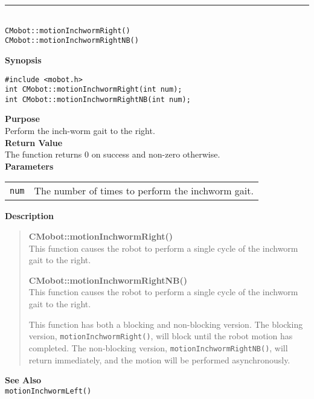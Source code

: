 \noindent
\vspace{5pt}
\rule{4.5in}{0.015in}\\
\noindent
{\LARGE \texttt{CMobot::motionInchwormRight()}}\\
{\LARGE \texttt{CMobot::motionInchwormRightNB()}}\\
{}

\noindent
{\bf Synopsis}
\vspace{-8pt}
\begin{verbatim}
#include <mobot.h>
int CMobot::motionInchwormRight(int num);
int CMobot::motionInchwormRightNB(int num);
\end{verbatim}

\noindent
{\bf Purpose}\\
Perform the inch-worm gait to the right.\\

\noindent
{\bf Return Value}\\
The function returns 0 on success and non-zero otherwise.\\

\noindent
{\bf Parameters}\\
\vspace{-0.1in}
\begin{description}
\item               
\begin{tabular}{p{15 mm}p{145 mm}}
\texttt{num} & The number of times to perform the inchworm gait.\\
\end{tabular}
\end{description}

\noindent
{\bf Description}\\
\vspace{-12pt}
\begin{quote}
{\bf CMobot::motionInchwormRight()}\\
This function causes the robot to perform a single cycle of the inchworm gait
to the right. 

{\bf CMobot::motionInchwormRightNB()}\\
This function causes the robot to perform a single cycle of the inchworm gait
to the right. 

This function has both a blocking and non-blocking version.
The blocking version, \texttt{motionInchwormRight()}, will block until the
robot motion has completed. The non-blocking version, \texttt{motionInchwormRightNB()},
will return immediately, and the motion will be performed asynchronously.\\
\end{quote}

\noindent
{\bf See Also}\\
\texttt{motionInchwormLeft()}

